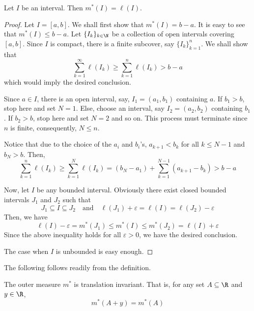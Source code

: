\begin{proposition}
    Let $I$ be an interval. Then $m^*(I) = \ell(I)$.
\end{proposition}
\begin{proof}
    Let $I = [a,b]$. We shall first show that $m^*(I) = b - a$. It is easy to see that $m^*(I)\le b - a$. Let $\{I_k\}_{k\in\N}$ be a collection of open intervals covering $[a,b]$. Since $I$ is compact, there is a finite subcover, say $\{I_k\}_{k = 1}^n$. We shall show that 
    \begin{equation*}
        \sum_{k = 1}^\infty\ell(I_k)\ge\sum_{k = 1}^n\ell(I_k) > b - a
    \end{equation*}
    which would imply the desired conclusion.

    Since $a\in I$, there is an open interval, say, $I_1 = (a_1, b_1)$ containing $a$. If $b_1 > b$, stop here and set $N = 1$. Else, choose an interval, say $I_2 = (a_2, b_2)$ containing $b_1$. If $b_2 > b$, stop here and set $N = 2$ and so on. This process must terminate since $n$ is finite, consequently, $N\le n$.

    Notice that due to the choice of the $a_i$ and $b_i$'s, $a_{k + 1} < b_k$ for all $k\le N - 1$ and $b_N > b$. Then, 
    \begin{equation*}
        \sum_{k = 1}^n\ell(I_k)\ge\sum_{k = 1}^N\ell(I_k) = (b_N - a_1) + \sum_{k = 1}^{N - 1}(a_{k + 1} - b_k) > b - a
    \end{equation*}

    Now, let $I$ be any bounded interval. Obviously there exist closed bounded intervals $J_1$ and $J_2$ such that 
    \begin{equation*}
        J_1\subseteq I\subseteq J_2\quad\text{and}\quad\ell(J_1) + \varepsilon = \ell(I) = \ell(J_2) - \varepsilon
    \end{equation*}
    Then, we have 
    \begin{equation*}
        \ell(I) - \varepsilon = m^*(J_1)\le m^*(I)\le m^*(J_2) = \ell(I) + \varepsilon
    \end{equation*}
    Since the above inequality holds for all $\varepsilon > 0$, we have the desired conclusion.

    The case when $I$ is unbounded is easy enough.
\end{proof}

The following follows readily from the definition.
\begin{proposition}
    The outer measure $m^*$ is translation invariant. That is, for any set $A\subseteq\R$ and $y\in\R$, 
    \begin{equation*}
        m^*(A + y) = m^*(A)
    \end{equation*}
\end{proposition}

